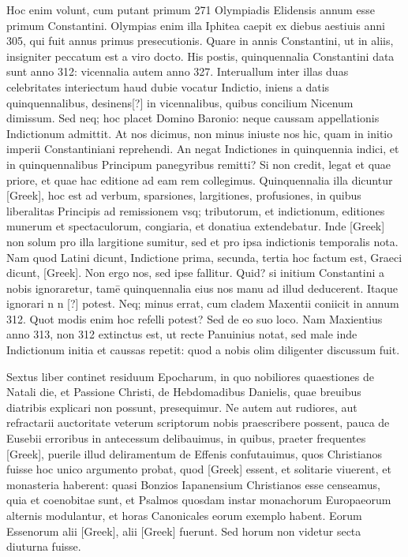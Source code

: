 \begin{parnumbers}
{}
Hoc enim volunt,
cum putant primum 271 Olympiadis Elidensis annum esse primum
Constantini.
\lnr{}Olympias enim illa Iphitea caepit ex diebus aestiuis
anni 305, qui fuit annus primus presecutionis.
\lnr{}Quare in annis
Constantini, ut in aliis, insigniter peccatum est a viro docto.
\lnr{}His
postis, quinquennalia Constantini data sunt anno 312: vicennalia
autem anno 327.
\lnr{}Interuallum inter illas duas celebritates interiectum
haud dubie vocatur Indictio, iniens a datis quinquennalibus,
desinens[?] in vicennalibus, quibus concilium Nicenum dimissum.
\lnr{}Sed neq; hoc placet Domino Baronio: neque caussam appellationis
Indictionum admittit.
\lnr{}At nos dicimus, non minus iniuste nos
hic, quam in initio imperii Constantiniani reprehendi.
\lnr{}An negat
Indictiones in quinquennia indici, et in quinquennalibus Principum
panegyribus remitti?
\lnr{}Si non credit, legat et quae priore, et quae
hac editione ad eam rem collegimus.
\lnr{}Quinquennalia illa dicuntur
\textgreek{[Greek]}, hoc est ad verbum, sparsiones, largitiones, profusiones, in
quibus liberalitas Principis ad remissionem vsq; tributorum, et indictionum,
editiones munerum et spectaculorum, congiaria, et donatiua
extendebatur.
\lnr{}Inde \textgreek{[Greek]} non solum pro illa largitione
sumitur, sed et pro ipsa indictionis temporalis nota.
\lnr{}Nam quod Latini
dicunt, Indictione prima, secunda, tertia hoc factum est, Graeci
dicunt, \textgreek{[Greek]}.
\lnr{}Non ergo nos, sed ipse fallitur.
\lnr{}Quid?
\lnr{}si initium Constantini a nobis ignoraretur, tamē quinquennalia
eius nos manu ad illud deducerent.
\lnr{}Itaque ignorari n n [?]
potest.
\lnr{}Neq; minus errat, cum cladem Maxentii coniicit in annum
312.
\lnr{}Quot modis enim hoc refelli potest?
\lnr{}Sed de eo suo loco.
\lnr{}Nam
Maxientius anno 313, non 312 extinctus est, ut recte Panuinius notat,
sed male inde Indictionum initia et caussas repetit: quod a nobis
olim diligenter discussum fuit.

Sextus liber continet residuum Epocharum,
in quo nobiliores quaestiones de Natali die, et Passione Christi,
de Hebdomadibus Danielis, quae breuibus diatribis explicari
non possunt, presequimur.
\lnr{}Ne autem aut rudiores, aut refractarii auctoritate
veterum scriptorum nobis praescribere possent, pauca de
Eusebii erroribus in antecessum delibauimus, in quibus, praeter frequentes
\textgreek{[Greek]}, puerile illud deliramentum de Effenis confutauimus,
quos Christianos fuisse hoc unico argumento probat, quod
\textgreek{[Greek]} essent, et solitarie viuerent, et monasteria haberent:
\lnr{}quasi Bonzios
Iapanensium Christianos esse censeamus, quia et coenobitae sunt,
et Psalmos quosdam instar monachorum Europaeorum alternis modulantur,
et horas Canonicales eorum exemplo habent.
\lnr{}Eorum Essenorum alii \textgreek{[Greek]}, alii \textgreek{[Greek]} fuerunt.
\lnr{}Sed horum non videtur
secta diuturna fuisse.


\end{parnumbers}
